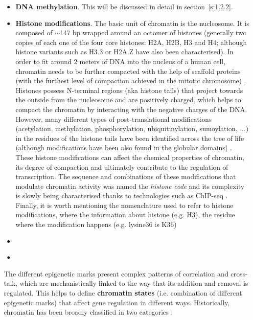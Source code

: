 \begin{itemize}
	
	\item \textbf{DNA methylation}. This will be discussed in detail in section~\ref{s:1.2.2}.
	
	
	\item \textbf{Histone modifications}. The basic unit of chromatin is the nucleosome. It is composed of $\sim$147 \acrshort{bp} wrapped around an octomer of histones (generally two copies of each one of the four core histones: H2A, H2B, H3 and H4; although histone variants such as H3.3 or H2A.Z have also been characterised). In order to fit around 2 meters of DNA into the nucleus of a human cell, chromatin needs to be further compacted with the help of scaffold proteins (with the furthest level of compaction achieved in the mitotic chromosome) \cite{Ou2017}. Histones possess N-terminal regions (aka histone tails) that project towards the outside from the nucleosome and are positively charged, which helps to compact the chromatin by interacting with the negative charges of the DNA. However, many different types of post-translational modifications (acetylation, methylation, phosphorylation, ubiquitinylation, sumoylation, ...) in the residues of the histone tails have been identified across the tree of life (although modifications have been also found in the globular domains) \cite{Lawrence2016}. These histone modifications can affect the chemical properties of chromatin, its degree of compaction and ultimately contribute to the regulation of transcription. The sequence and combinations of these modifications that modulate chromatin activity was named the \textit{histone code} \cite{Strahl2000} and its complexity is slowly being characterised thanks to technologies such as \acrshort{ChIP-seq} \cite{Consortium2012, Consortium2015}. Finally, it is worth mentioning the nomenclature used to refer to histone modifications, where the information about histone (e.g. H3), the residue where the modification happens (e.g. lysine36 is K36) 	

	\item \textbf{}
	
	\item
	
\end{itemize}

The different epigenetic marks present complex patterns of correlation and cross-talk, which are mechanistically linked to the way that its addition and removal is regulated. This helps to define \textbf{chromatin states} (i.e. combination of different epigenetic marks) that affect gene regulation in different ways. Historically, chromatin has been broadly classified in two categories \cite{Allis2016,Reinberg2018,Trojer2007}:

